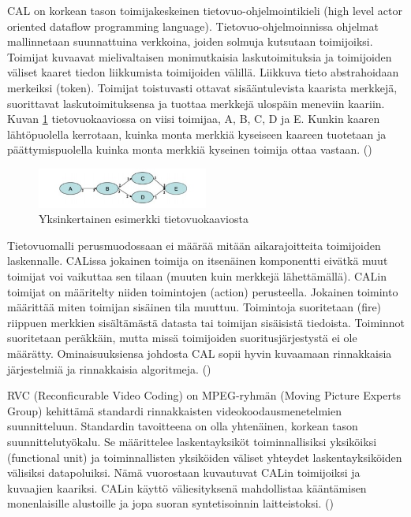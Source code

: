 CAL on korkean tason toimijakeskeinen tietovuo-ohjelmointikieli (high level
actor oriented dataflow programming language). Tietovuo-ohjelmoinnissa ohjelmat
mallinnetaan suunnattuina verkkoina, joiden solmuja kutsutaan toimijoiksi.
Toimijat kuvaavat mielivaltaisen monimutkaisia laskutoimituksia ja toimijoiden
väliset kaaret tiedon liikkumista toimijoiden välillä. Liikkuva tieto
abstrahoidaan merkeiksi (token). Toimijat toistuvasti ottavat sisääntulevista kaarista
merkkejä, suorittavat laskutoimituksensa ja tuottaa merkkejä ulospäin
meneviin kaariin. Kuvan \ref{fig:dataflow} tietovuokaaviossa on viisi toimijaa,
A, B, C, D ja E. Kunkin kaaren lähtöpuolella kerrotaan, kuinka monta merkkiä
kyseiseen kaareen tuotetaan ja päättymispuolella kuinka monta merkkiä kyseinen
toimija ottaa vastaan. (\citealt{rvc})

\begin{figure}[ht]
	\centering
	\includegraphics[width=0.5\textwidth]{dataflow.jpg}
	\caption{Yksinkertainen esimerkki tietovuokaaviosta}
	\label{fig:dataflow}
\end{figure}

Tietovuomalli perusmuodossaan ei määrää mitään aikarajoitteita toimijoiden
laskennalle. CALissa jokainen toimija on itsenäinen komponentti eivätkä muut
toimijat voi vaikuttaa sen tilaan (muuten kuin merkkejä lähettämällä). CALin
toimijat on määritelty niiden toimintojen (action) perusteella. Jokainen
toiminto määrittää miten toimijan sisäinen tila muuttuu. Toimintoja
suoritetaan (fire) riippuen merkkien sisältämästä datasta tai toimijan
sisäisistä tiedoista. Toiminnot suoritetaan peräkkäin, mutta missä toimijoiden
suoritusjärjestystä ei ole määrätty. Ominaisuuksiensa johdosta CAL sopii hyvin 
kuvaamaan rinnakkaisia järjestelmiä ja rinnakkaisia algoritmeja. (\citealt{rvc})

RVC (Reconficurable Video Coding) on MPEG-ryhmän (Moving Picture Experts
Group) kehittämä standardi rinnakkaisten videokoodausmenetelmien suunnitteluun.
Standardin tavoitteena on olla yhtenäinen, korkean tason suunnittelutyökalu.
Se määrittelee laskentayksiköt toiminnallisiksi yksiköiksi (functional unit)
ja toiminnallisten yksiköiden väliset yhteydet laskentayksiköiden välisiksi
datapoluiksi. Nämä vuorostaan kuvautuvat CALin toimijoiksi ja kuvaajien
kaariksi. CALin käyttö väliesityksenä mahdollistaa kääntämisen monenlaisille
alustoille ja jopa suoran syntetisoinnin laitteistoksi. (\citealt{rvc})

